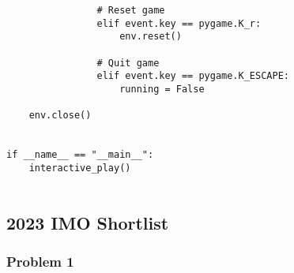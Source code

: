 \begin{lstlisting}
                # Reset game
                elif event.key == pygame.K_r:
                    env.reset()

                # Quit game
                elif event.key == pygame.K_ESCAPE:
                    running = False

    env.close()


if __name__ == "__main__":
    interactive_play()


\end{lstlisting}


\newpage
\clearpage


\subsection*{2023 IMO Shortlist}
\label{appendix:H_2023_IMO_Shortlist}

\subsubsection*{Problem 1}
\label{appendix:H_2023_IMO_Shortlist_C1}

